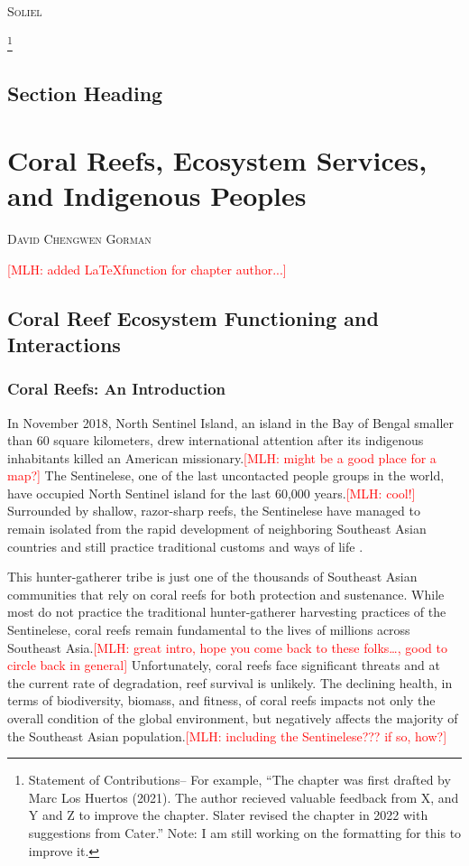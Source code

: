 \documentclass{book}\usepackage{knitr}
\makeatletter
\newcommand{\red}[1]{\textcolor{red}{[MLH: #1]}}
\newcommand{\chapterauthor}[1]{%
  {\parindent0pt\vspace*{-25pt}%
  \linespread{1.1}\large\scshape#1%
  \par\nobreak\vspace*{35pt}}
  \@afterheading%
}
\makeatother
\begin{document}
\begin{knitrout}
\begin{kframe}
{\chapterauthor{Soliel}

\footnote{Statement of Contributions-- For example, ``The chapter was first drafted by Marc Los Huertos (2021). The author recieved valuable feedback from X, and Y and Z to improve the chapter. Slater revised the chapter in 2022 with suggestions from Cater.'' Note: I am still working on the formatting for this to improve it.}

\section{Section Heading}%



\chapter{Coral Reefs, Ecosystem Services, and Indigenous Peoples}

\chapterauthor{David Chengwen Gorman} \red{added \LaTeX function  for chapter author...}

\section{Coral Reef Ecosystem Functioning and Interactions}

\subsection{Coral Reefs: An Introduction}

In November 2018, North Sentinel Island, an island in the Bay of Bengal smaller than 60 square kilometers, drew international attention after its indigenous inhabitants killed an American missionary.\red{might be a good place for a map?} The Sentinelese, one of the last uncontacted people groups in the world, have occupied North Sentinel island for the last 60,000 years.\red{cool!} Surrounded by shallow, razor-sharp reefs, the Sentinelese have managed to remain isolated from the rapid development of neighboring Southeast Asian countries and still practice traditional customs and ways of life \citep{Smith}.

This hunter-gatherer tribe is just one of the thousands of Southeast Asian communities that rely on coral reefs for both protection and sustenance. While most do not practice the traditional hunter-gatherer harvesting practices of the Sentinelese, coral reefs remain fundamental to the lives of millions across Southeast Asia.\red{great intro, hope you come back to these folks\ldots, good to circle back in general} Unfortunately, coral reefs face significant threats and at the current rate of degradation, reef survival is unlikely. The declining health, in terms of biodiversity, biomass, and fitness, of coral reefs impacts not only the overall condition of the global environment, but negatively affects the majority of the Southeast Asian population.\red{including the Sentinelese??? if so, how?}

}
\end{kframe}
\end{knitrout}
\end{document}
